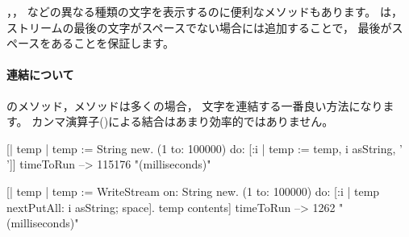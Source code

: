 \documentclass[a4paper,10pt,twoside]{book}
\begin{document}
，， 
などの異なる種類の文字を表示するのに便利なメソッドもあります。
は，ストリームの最後の文字がスペースでない場合には追加することで，
最後がスペースをあることを保証します。

\paragraph{連結について}

のメソッド，メソッドは多くの場合，
文字を連結する一番良い方法になります。
カンマ演算子(\ct{,})による結合はあまり効率的ではありません。


\begin{code}{}
[| temp |
  temp := String new.
  (1 to: 100000)
    do: [:i | temp := temp, i asString, ' ']] timeToRun --> 115176 "(milliseconds)"

[| temp |
  temp := WriteStream on: String new.
  (1 to: 100000)
    do: [:i | temp nextPutAll: i asString; space].
  temp contents] timeToRun --> 1262 "(milliseconds)"
\end{code}
\end{document}
